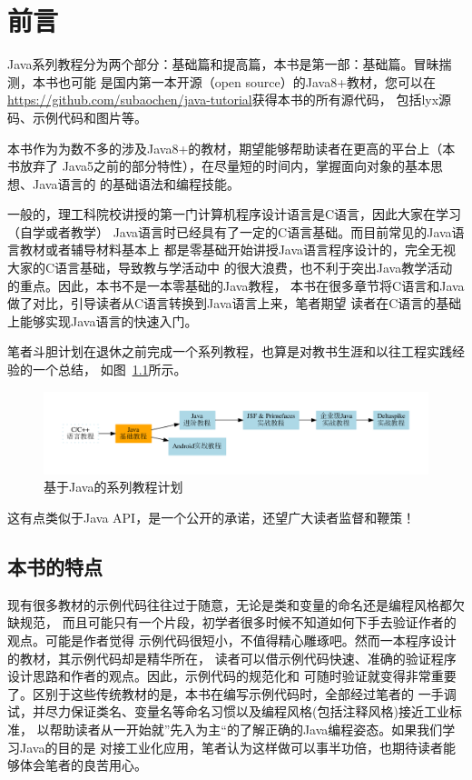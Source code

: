 \frontmatter
\chapter{前言}
Java系列教程分为两个部分：基础篇和提高篇，本书是第一部：基础篇。冒昧揣测，本书也可能
是国内第一本开源（open source）的Java8+教材，您可以在
\url{https://github.com/subaochen/java-tutorial}获得本书的所有源代码，
包括lyx源码、示例代码和图片等。

本书作为为数不多的涉及Java8+的教材，期望能够帮助读者在更高的平台上（本书放弃了
Java5之前的部分特性），在尽量短的时间内，掌握面向对象的基本思想、Java语言的
的基础语法和编程技能。

一般的，理工科院校讲授的第一门计算机程序设计语言是C语言，因此大家在学习（自学或者教学）
Java语言时已经具有了一定的C语言基础。而目前常见的Java语言教材或者辅导材料基本上
都是零基础开始讲授Java语言程序设计的，完全无视大家的C语言基础，导致教与学活动中
的很大浪费，也不利于突出Java教学活动的重点。因此，本书不是一本零基础的Java教程，
本书在很多章节将C语言和Java做了对比，引导读者从C语言转换到Java语言上来，笔者期望
读者在C语言的基础上能够实现Java语言的快速入门。

笔者斗胆计划在退休之前完成一个系列教程，也算是对教书生涯和以往工程实践经验的一个总结，
如图~\ref{fig:tutorial-plan}所示。

\begin{figure}[htbp]
    \centering
    \includegraphics[width=\textwidth]{imgs/frontmatter/tutorials-plan}
    \caption{基于Java的系列教程计划}
    \label{fig:tutorial-plan}
\end{figure}

这有点类似于Java API，是一个公开的承诺，还望广大读者监督和鞭策！

\section*{本书的特点}
现有很多教材的示例代码往往过于随意，无论是类和变量的命名还是编程风格都欠缺规范，
而且可能只有一个片段，初学者很多时候不知道如何下手去验证作者的观点。可能是作者觉得
示例代码很短小，不值得精心雕琢吧。然而一本程序设计的教材，其示例代码却是精华所在，
读者可以借示例代码快速、准确的验证程序设计思路和作者的观点。因此，示例代码的规范化和
可随时验证就变得非常重要了。区别于这些传统教材的是，本书在编写示例代码时，全部经过笔者的
一手调试，并尽力保证类名、变量名等命名习惯以及编程风格(包括注释风格)接近工业标准，
以帮助读者从一开始就”先入为主“的了解正确的Java编程姿态。如果我们学习Java的目的是
对接工业化应用，笔者认为这样做可以事半功倍，也期待读者能够体会笔者的良苦用心。


